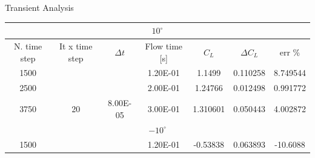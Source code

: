 \documentclass[english,10pt,a4paper,twoside]{beamer}
\begin{document}
\begin{frame}[shrink = 25]{Transient Analysis}
\begin{table}[H]
	\centering
	\begin{tabular}{|ccccccc|}
		\hline
		\multicolumn{7}{|c|}{$10^\circ$}                                                                                                                                                                                                                                                                                    \\ \hline
		\multicolumn{1}{|c|}{N. time step}                 & \multicolumn{1}{c|}{It x time step}       & \multicolumn{1}{c|}{$\Delta t$}                 & \multicolumn{1}{c|}{Flow time [s]} & \multicolumn{1}{c|}{$C_L$}    & \multicolumn{1}{c|}{$\Delta C_L$} & err \%                                                  \\ \hline
		\multicolumn{1}{|c|}{1500}                         & \multicolumn{1}{c|}{}                     & \multicolumn{1}{c|}{}                           & \multicolumn{1}{c|}{1.20E-01}      & \multicolumn{1}{c|}{1.1499}   & \multicolumn{1}{c|}{0.110258}     & 8.749544                                                \\ \cline{1-1} \cline{4-7} 
		\multicolumn{1}{|c|}{\cellcolor[HTML]{FCFF2F}2500} & \multicolumn{1}{c|}{}                     & \multicolumn{1}{c|}{}                           & \multicolumn{1}{c|}{2.00E-01}      & \multicolumn{1}{c|}{1.24766}  & \multicolumn{1}{c|}{0.012498}     & \cellcolor[HTML]{FCFF2F}0.991772                        \\ \cline{1-1} \cline{4-7} 
		\multicolumn{1}{|c|}{3750}                         & \multicolumn{1}{c|}{\multirow{-3}{*}{20}} & \multicolumn{1}{c|}{\multirow{-3}{*}{8.00E-05}} & \multicolumn{1}{c|}{3.00E-01}      & \multicolumn{1}{c|}{1.310601} & \multicolumn{1}{c|}{0.050443}     & 4.002872                                                \\ \hline
		\multicolumn{7}{|c|}{$-10^\circ$}                                                                                                                                                                                                                                                                                   \\ \hline
		\multicolumn{1}{|c|}{1500}                         & \multicolumn{1}{c|}{}                     & \multicolumn{1}{c|}{}                           & \multicolumn{1}{c|}{1.20E-01}      & \multicolumn{1}{c|}{-0.53838} & \multicolumn{1}{c|}{0.063893}     & -10.6088                                                \\ \cline{1-1} \cline{4-7} 

\end{tabular}
\end{table}
\end{frame}
\end{document}
